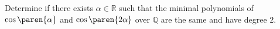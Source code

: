 Determine if there exists $\alpha \in \mathbb{R}$
such that the minimal polynomials of $\cos\paren{\alpha}$ and $\cos\paren{2 \alpha}$
over $\mathbb{Q}$ are the same and have degree $2$.
